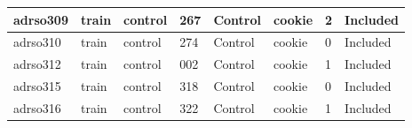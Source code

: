 \begin{center}
\begin{longtable}{|l|l|l|l|l|l|l|l|}
adrso309       & train                 & control           & 267                & Control              & cookie          & 2                & Included      \\ \hline
adrso310       & train                 & control           & 274                & Control              & cookie          & 0                & Included      \\ \hline
adrso312       & train                 & control           & 002                & Control              & cookie          & 1                & Included      \\ \hline
adrso315       & train                 & control           & 318                & Control              & cookie          & 0                & Included      \\ \hline
adrso316       & train                 & control           & 322                & Control              & cookie          & 1                & Included      \\ \hline
\end{longtable}
\normalsize
\end{center}
